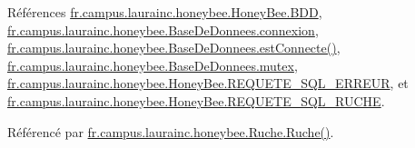 Références \hyperlink{classfr_1_1campus_1_1laurainc_1_1honeybee_1_1_honey_bee_abfb4f6cc1c8bb793c37ccb8408abc51c}{fr.\+campus.\+laurainc.\+honeybee.\+Honey\+Bee.\+B\+DD}, \hyperlink{classfr_1_1campus_1_1laurainc_1_1honeybee_1_1_base_de_donnees_a358899633f17b8cd00dd2c4cfdd40abe}{fr.\+campus.\+laurainc.\+honeybee.\+Base\+De\+Donnees.\+connexion}, \hyperlink{classfr_1_1campus_1_1laurainc_1_1honeybee_1_1_base_de_donnees_a735f54c2c183a595c9a9a5ba947491f5}{fr.\+campus.\+laurainc.\+honeybee.\+Base\+De\+Donnees.\+est\+Connecte()}, \hyperlink{classfr_1_1campus_1_1laurainc_1_1honeybee_1_1_base_de_donnees_a0dd6f285a11459c086adea6080bed282}{fr.\+campus.\+laurainc.\+honeybee.\+Base\+De\+Donnees.\+mutex}, \hyperlink{classfr_1_1campus_1_1laurainc_1_1honeybee_1_1_honey_bee_a275b7a8582c8193ff444d21928ef7e36}{fr.\+campus.\+laurainc.\+honeybee.\+Honey\+Bee.\+R\+E\+Q\+U\+E\+T\+E\+\_\+\+S\+Q\+L\+\_\+\+E\+R\+R\+E\+UR}, et \hyperlink{classfr_1_1campus_1_1laurainc_1_1honeybee_1_1_honey_bee_a933d238d27d6b17df6f65bef23a2de1d}{fr.\+campus.\+laurainc.\+honeybee.\+Honey\+Bee.\+R\+E\+Q\+U\+E\+T\+E\+\_\+\+S\+Q\+L\+\_\+\+R\+U\+C\+HE}.



Référencé par \hyperlink{classfr_1_1campus_1_1laurainc_1_1honeybee_1_1_ruche_a969fe0f6a0e3176a86b498306dc7f0b0}{fr.\+campus.\+laurainc.\+honeybee.\+Ruche.\+Ruche()}.


